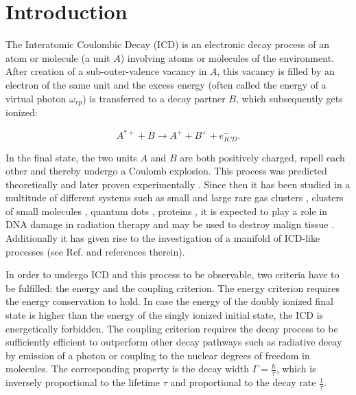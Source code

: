 \section{Introduction}

The Interatomic Coulombic Decay (ICD) is an electronic decay process of an atom or
molecule (a unit $A$) involving atoms or molecules of the environment. After
creation of a sub-outer-valence vacancy in $A$, this vacancy is filled
by an electron of the same unit and the excess energy (often called the energy of
a virtual photon $\omega_{vp}$) is transferred to a decay
partner $B$, which subsequently gets ionized:

\begin{equation*}
 A^{*+} + B \rightarrow A^+ + B^+ + e^-_{ICD}  .
\end{equation*}

In the final state,
the two units $A$ and $B$ are both positively charged, repell each other and
thereby undergo a Coulomb explosion. This process was predicted theoretically
\cite{Cederbaum97} and later proven experimentally \cite{Marburger03}. Since then
it has been studied in a multitude of different systems such as small and large
rare gas clusters \cite{Santra00_1,Santra01_1,Santra01_3,Ohrwall04,Averbukh06_1,
Lundwall07,Jahnke10,Forstel13,Mucke15,Fasshauer14_1},
clusters of small molecules \cite{Zobeley98,Pernpointner06,Mueller06,
Kryzhevoi11_1,Ghosh13a},
quantum dots \cite{Bande13}, proteins \cite{Harbach13}, it is expected
to play a role in DNA damage in radiation therapy \cite{Alizadeh15}
and may be used to destroy malign
tissue \cite{Gokhberg14,Trinter14}. 
Additionally it has given rise to
the investigation of a manifold of ICD-like processes (see Ref.
\cite{Hergenhahn11,Jahnke15}
and references therein).

In order to undergo ICD and this process to be observable, two criteria have to
be fulfilled: the energy and the coupling criterion. The energy criterion
requires the energy conservation to hold. In case the energy of the
doubly ionized final
state is higher than the energy of the singly ionized initial state, the ICD
is energetically forbidden. The coupling criterion requires the decay
process to be sufficiently efficient to outperform other decay pathways
such as radiative decay by emission of a photon or coupling to the nuclear
degrees of freedom in molecules. The corresponding property is the
decay width $\Gamma = \frac{\hbar}{\tau}$, which is inversely proportional
to the lifetime $\tau$ and proportional to the decay rate $\frac{1}{\tau}$.

